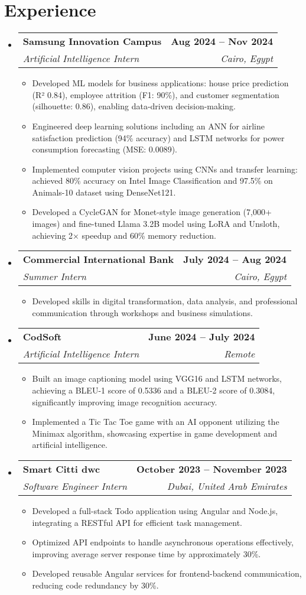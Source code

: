 \documentclass[letterpaper,11pt]{article}
\makeatletter
\newcommand{\resumeItem}[1]{
  \item\small{
    {#1 \vspace{-2pt}}
  }
}
\newcommand{\resumeSubheading}[4]{
  \vspace{-2pt}\item
    \begin{tabular*}{1.0\textwidth}[t]{l@{\extracolsep{\fill}}r}
      \textbf{#1} & \textbf{\small #2} \\
      \textit{\small#3} & \textit{\small #4} \\
    \end{tabular*}\vspace{-7pt}
}
\newcommand{\resumeSubHeadingListStart}{\begin{itemize}[leftmargin=0.0in, label={}]}
\newcommand{\resumeSubHeadingListEnd}{\end{itemize}}
\newcommand{\resumeItemListStart}{\begin{itemize}}
\newcommand{\resumeItemListEnd}{\end{itemize}\vspace{-5pt}}
\makeatother
\begin{document}
\section{Experience}
  \resumeSubHeadingListStart

    \resumeSubheading
      {Samsung Innovation Campus}{Aug 2024 -- Nov 2024}
      {Artificial Intelligence Intern}{Cairo, Egypt}
      \resumeItemListStart
        \resumeItem{Developed ML models for business applications: house price prediction (R² 0.84), employee attrition (F1: 90\%), and customer segmentation (silhouette: 0.86), enabling data-driven decision-making.}
        \resumeItem{Engineered deep learning solutions including an ANN for airline satisfaction prediction (94\% accuracy) and LSTM networks for power consumption forecasting (MSE: 0.0089).}
        \resumeItem{Implemented computer vision projects using CNNs and transfer learning: achieved 80\% accuracy on Intel Image Classification and 97.5\% on Animals-10 dataset using DenseNet121.}
        \resumeItem{Developed a CycleGAN for Monet-style image generation (7,000+ images) and fine-tuned Llama 3.2B model using LoRA and Unsloth, achieving 2× speedup and 60\% memory reduction.}
      \resumeItemListEnd

    \resumeSubheading
      {Commercial International Bank}{July 2024 -- Aug 2024}
      {Summer Intern}{Cairo, Egypt}
      \resumeItemListStart
        \resumeItem{Developed skills in digital transformation, data analysis, and professional 
  communication through workshops and business simulations.}
    \resumeItemListEnd
    
    \resumeSubheading
    {CodSoft} {June 2024 -- July 2024}
    {Artificial Intelligence Intern} {Remote}
    \resumeItemListStart
    \resumeItem{Built an image captioning model using VGG16 and LSTM networks, achieving a BLEU-1 score of 0.5336 and a BLEU-2 score of 0.3084, significantly improving image recognition accuracy.}
    \resumeItem{Implemented a Tic Tac Toe game with an AI opponent utilizing the Minimax algorithm, showcasing expertise in game development and artificial intelligence.}
    \resumeItemListEnd

    \resumeSubheading
    {Smart Citti dwc}{October 2023 -- November 2023}
      {Software Engineer Intern}{Dubai, United Arab Emirates}
      \resumeItemListStart
      \resumeItem{Developed a full-stack Todo application using Angular and Node.js, integrating a RESTful API for efficient task management.}
      \resumeItem{Optimized API endpoints to handle asynchronous operations effectively, improving average server response time by approximately 30\%.}
      \resumeItem{Developed reusable Angular services for frontend-backend communication, reducing code redundancy by 30\%.}
      \resumeItemListEnd
    \
  \resumeSubHeadingListEnd
\vspace{-22pt}
\end{document}
